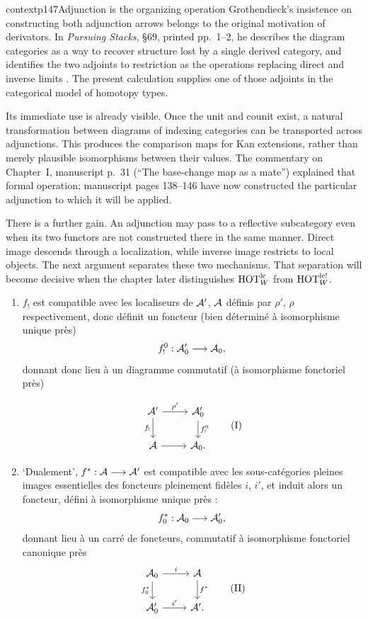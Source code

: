 \begin{dcomment}{context}{p147}{Adjunction is the organizing operation}
Grothendieck's insistence on constructing both adjunction arrows belongs to the original motivation of derivators. In \emph{Pursuing Stacks}, \S69, printed pp.~1--2, he describes the diagram categories as a way to recover structure lost by a single derived category, and identifies the two adjoints to restriction as the operations replacing direct and inverse limits \citep{Grothendieck1983}. The present calculation supplies one of those adjoints in the categorical model of homotopy types.

Its immediate use is already visible. Once the unit and counit exist, a natural transformation between diagrams of indexing categories can be transported across adjunctions. This produces the comparison maps for Kan extensions, rather than merely plausible isomorphisms between their values. The commentary on Chapter~I, manuscript p.~31 (``The base-change map as a mate'') explained that formal operation; manuscript pages 138--146 have now constructed the particular adjunction to which it will be applied.

There is a further gain. An adjunction may pass to a reflective subcategory even when its two functors are not constructed there in the same manner. Direct image descends through a localization, while inverse image restricts to local objects. The next argument separates these two mechanisms. That separation will become decisive when the chapter later distinguishes $\mathrm{HOT}_W^{\mathrm{lc}}$ from $\mathrm{HOT}_W^{\mathrm{lc}!}$.
\end{dcomment}


\begin{enumerate}
\item[a)] $f_!$ est compatible avec les localiseurs de $\mathcal{A}'$, $\mathcal{A}$ définis par $\rho'$, $\rho$ respectivement, donc définit un foncteur (bien déterminé à isomorphisme unique près)
\[
f_!^0 : \mathcal{A}'_0 \longrightarrow \mathcal{A}_0,
\]
donnant donc lieu à un diagramme commutatif (à isomorphisme fonctoriel près)


\[
\begin{tikzcd}
\cA' \arrow[r, "\rho'"] \arrow[d, "f_!"'] & \cA'_0 \arrow[d, "f_!^0"] \\
\cA \arrow[r] & \cA_0.
\end{tikzcd}
\tag*{(I)}
\]


\item[b)] ‘Dualement’, $f^* : \mathcal{A} \longrightarrow \mathcal{A}'$ est compatible avec les sous-catégories pleines images essentielles des foncteurs pleinement fidèles $i$, $i'$, et induit
alors un foncteur, défini à isomorphisme unique près :
\[
f_0^* : \mathcal{A}_0 \longrightarrow \mathcal{A}'_0,
\]
donnant lieu à un carré de foncteurs, commutatif à isomorphisme fonctoriel canonique près
\[
\begin{tikzcd}
\cA_0 \arrow[r, "i"] \arrow[d, "f_0^*"'] & \cA \arrow[d, "f^*"] \\
\cA'_0 \arrow[r, "i'"] & \cA'.
\end{tikzcd}
\tag*{(II)}
\]
\end{enumerate}


